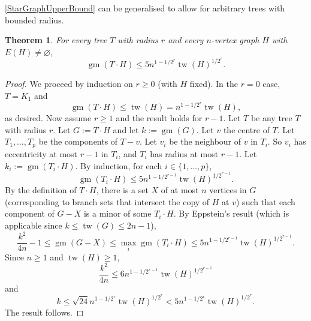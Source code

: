 \documentclass{patmorin}
\newcommand{\boxprod}{\mathbin{\Box}}
\renewcommand{\emptyset}{\varnothing}
\renewcommand{\geq}{\geqslant}
\renewcommand{\leq}{\leqslant}
\DeclareMathOperator{\tw}{tw}
\DeclareMathOperator{\gm}{gm}
\theoremstyle{plain}
\newtheorem{thm}{Theorem}
\theoremstyle{definition}
\begin{document}
\cref{StarGraphUpperBound} can be generalised to allow for arbitrary trees with bounded radius.

\begin{thm}
\label{TreeGraphUpperBound}
For every tree $T$ with radius $r$ and every $n$-vertex graph $H$ with $E(H)\neq\emptyset$, 
$$\gm(T\cdot H)\leq 5 n^{1-1/2^r} \tw(H)^{1/2^r}.$$
\end{thm}

\begin{proof}
We proceed by induction on $r\geq 0$ (with $H$ fixed). In the $r=0$ case, $T=K_1$ and
$$\gm(T\cdot H)\leq \tw(H) = n^{1-1/2^r} \tw(H),$$ as desired. 
Now assume $r\geq 1$ and the result holds for $r-1$. Let $T$ be any tree $T$ with radius $r$. Let $G:=T\cdot H$ and let $k:=\gm(G)$. Let $v$ the centre of $T$. Let $T_1,\dots,T_p$ be the components of $T-v$. Let $v_i$ be the neighbour of $v$ in $T_i$. So $v_i$ has eccentricity at most $r-1$ in $T_i$, and $T_i$ has radius at most $r-1$. Let $k_i:=\gm(T_i\cdot H)$. By induction, for each $i\in\{1,\dots,p\}$,
$$\gm(T_i\cdot H)\leq 5 n^{1-1/2^{r-1}} \tw(H)^{1/2^{r-1}}.$$
By the definition of $T\cdot H$, there is a set $X$ of at most $n$ vertices in $G$ (corresponding to branch sets that intersect the copy of $H$ at $v$) such that each component of $G-X$ is a minor of some $T_i\cdot H$. 
By Eppstein's result (which is applicable since $k\leq \tw(G) \leq 2n-1$), 
$$ \frac{k^2}{4n}-1 \leq \gm(G-X) \leq 
\max_i \gm(T_i\cdot H) \leq 5 n^{1-1/2^{r-1}} \tw(H)^{1/2^{r-1}}.$$
Since $n\geq 1$ and $\tw(H)\geq 1$, 
$$ \frac{k^2}{4n} \leq 6 n^{1-1/2^{r-1}} \tw(H)^{1/2^{r-1}}$$
and
$$ k \leq 
\sqrt{24} n^{1-1/2^r} \tw(H)^{1/2^r}
< 5 n^{1-1/2^r} \tw(H)^{1/2^r}
.$$
The result follows.
\end{proof}




\end{document}
